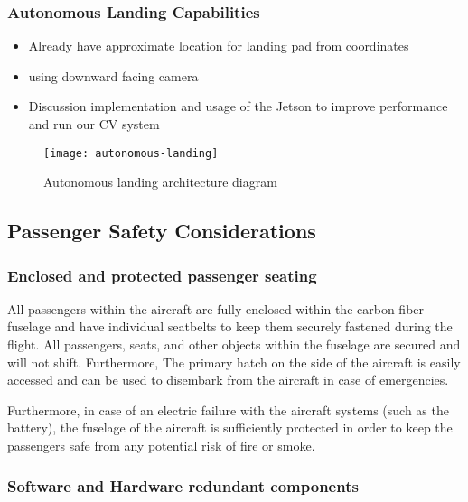 \subsubsection{Autonomous Landing Capabilities}


\begin{itemize}
	\item Already have approximate location for landing pad from coordinates
	\item using downward facing camera 
	\item Discussion implementation and usage of the Jetson to improve performance
		and run our CV system
\end{itemize}

\begin{figure}[h]
	\caption{Autonomous landing architecture diagram}
	\centering
	\texttt{[image: autonomous-landing]}
\end{figure}

\subsection{Passenger Safety Considerations}

\subsubsection{Enclosed and protected passenger seating}

All passengers within the aircraft are fully enclosed within the carbon fiber
fuselage and have individual seatbelts to keep them securely fastened during
the flight. All passengers, seats, and other objects within the fuselage are
secured and will not shift. Furthermore, The primary hatch on the side of the
aircraft is easily accessed and can be used to disembark from the aircraft in
case of emergencies.

Furthermore, in case of an electric failure with the aircraft systems (such as
the battery), the fuselage of the aircraft is sufficiently protected in order
to keep the passengers safe from any potential risk of fire or smoke.

\subsubsection{Software and Hardware redundant components}


